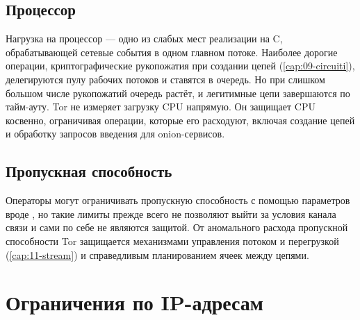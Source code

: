 \subsection{Процессор}

Нагрузка на процессор --- одно из слабых мест реализации на C, обрабатывающей сетевые события в одном главном потоке. Наиболее дорогие операции, криптографические рукопожатия при создании цепей (\cref{cap:09-circuiti}), делегируются пулу рабочих потоков и ставятся в очередь. Но при слишком большом числе рукопожатий очередь растёт, и легитимные цепи завершаются по тайм-ауту. Tor не измеряет загрузку CPU напрямую. Он защищает CPU косвенно, ограничивая операции, которые его расходуют, включая создание цепей и обработку запросов введения для onion-сервисов.

\subsection{Пропускная способность}

Операторы могут ограничивать пропускную способность с помощью параметров вроде , но такие лимиты прежде всего не позволяют выйти за условия канала связи и сами по себе не являются защитой. От аномального расхода пропускной способности Tor защищается механизмами управления потоком и перегрузкой (\cref{cap:11-stream}) и справедливым планированием ячеек между цепями.

\section{Ограничения по IP-адресам}\label{sec:dos-limiti}

